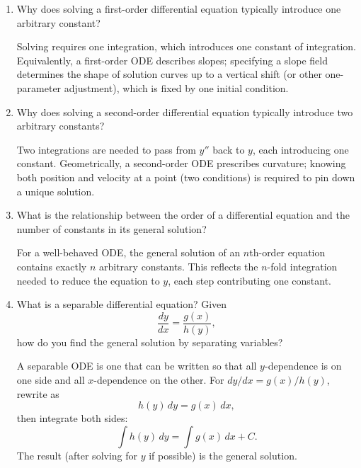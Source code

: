 \documentclass{essay}
\begin{document}
\begin{enumerate}[leftmargin=*, itemsep=8pt]
  \item Why does solving a first-order differential equation
    typically introduce one arbitrary constant?

    \begin{answer} Solving requires one integration, which
      introduces one constant of integration.  Equivalently, a
      first-order ODE describes slopes; specifying a slope field
      determines the shape of solution curves up to a vertical shift
      (or other one-parameter adjustment), which is fixed by one
      initial condition.
    \end{answer}

  \item Why does solving a second-order differential equation
    typically introduce two arbitrary constants?

    \begin{answer} Two integrations are needed to pass from $y''$
      back to $y$, each introducing one constant.  Geometrically, a
      second-order ODE prescribes curvature; knowing both position and
      velocity at a point (two conditions) is required to pin down a
      unique solution.
    \end{answer}

  \item What is the relationship between the order of a differential
    equation and the number of constants in its general solution?

    \begin{answer} For a well-behaved ODE, the general solution of
      an $n$th-order equation contains exactly $n$ arbitrary constants.
      This reflects the $n$-fold integration needed to reduce the
      equation to $y$, each step contributing one constant.
    \end{answer}

  \item What is a separable differential equation? Given \[
    \frac{dy}{dx}=\frac{g(x)}{h(y)}, \] how do you find the general
    solution by separating variables?

    \begin{answer} A separable ODE is one that can be written so
      that all $y$-dependence is on one side and all $x$-dependence on
      the other.  For $dy/dx=g(x)/h(y)$, rewrite as
      \[
        h(y)\,dy = g(x)\,dx,
      \]
      then integrate both sides:
      \[
        \int h(y)\,dy = \int g(x)\,dx + C.
      \]
      The result (after solving for $y$ if possible) is the general solution.
    \end{answer}


\end{enumerate}
\end{document}
